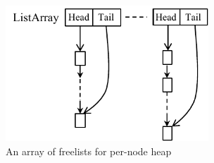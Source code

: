 
\begin{figure}[!ht]
\centering
\includegraphics[width=3in]{figure/listarray}
\caption{An array of freelists for per-node heap\label{fig:listarray}}
\vspace{-0.1in}
\end{figure}


